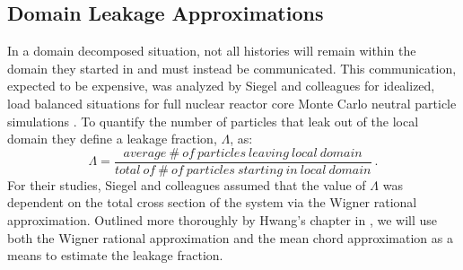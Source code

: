 \subsection{Domain Leakage Approximations}
\label{subsec:domain_leak_approx}
In a domain decomposed situation, not all histories will remain within
the domain they started in and must instead be communicated. This
communication, expected to be expensive, was analyzed by Siegel and
colleagues for idealized, load balanced situations for full nuclear
reactor core Monte Carlo neutral particle simulations
\citep{siegel_analysis_2012}.  To quantify the number of particles
that leak out of the local domain they define a leakage fraction,
$\Lambda$, as:
\begin{equation}
  \Lambda = \frac{average\ \#\ of\ particles\ leaving\ local\ domain}
          {total\ of\ \#\ of\ particles\ starting\ in\ local\ domain}\:.
          \label{eq:leakage_fraction}
\end{equation}
For their studies, Siegel and colleagues assumed that the value of
$\Lambda$ was dependent on the total cross section of the system via
the Wigner rational approximation. Outlined more thoroughly by Hwang's
chapter in \citep{azmy_nuclear_2010}, we will use both the Wigner
rational approximation and the mean chord approximation as a means to
estimate the leakage fraction.

